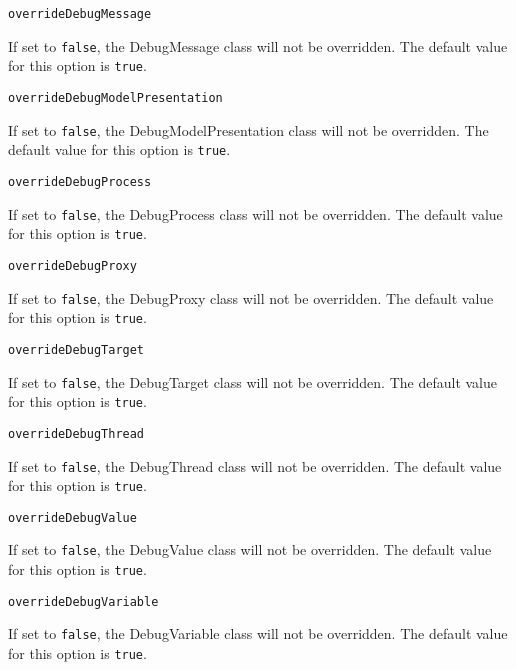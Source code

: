 \noindent\texttt{overrideDebugMessage}
\begin{myindentpar}{1cm}
If set to \texttt{false}, the DebugMessage class will not be overridden. The default value for this option is \texttt{true}.
\end{myindentpar}

\noindent\texttt{overrideDebugModelPresentation}
\begin{myindentpar}{1cm}
If set to \texttt{false}, the DebugModelPresentation class will not be overridden. The default value for this option is \texttt{true}.
\end{myindentpar}

\noindent\texttt{overrideDebugProcess}
\begin{myindentpar}{1cm}
If set to \texttt{false}, the DebugProcess class will not be overridden. The default value for this option is \texttt{true}.
\end{myindentpar}

\noindent\texttt{overrideDebugProxy}
\begin{myindentpar}{1cm}
If set to \texttt{false}, the DebugProxy class will not be overridden. The default value for this option is \texttt{true}.
\end{myindentpar}

\noindent\texttt{overrideDebugTarget}
\begin{myindentpar}{1cm}
If set to \texttt{false}, the DebugTarget class will not be overridden. The default value for this option is \texttt{true}.
\end{myindentpar}

\noindent\texttt{overrideDebugThread}
\begin{myindentpar}{1cm}
If set to \texttt{false}, the DebugThread class will not be overridden. The default value for this option is \texttt{true}.
\end{myindentpar}

\noindent\texttt{overrideDebugValue}
\begin{myindentpar}{1cm}
If set to \texttt{false}, the DebugValue class will not be overridden. The default value for this option is \texttt{true}.
\end{myindentpar}

\noindent\texttt{overrideDebugVariable}
\begin{myindentpar}{1cm}
If set to \texttt{false}, the DebugVariable class will not be overridden. The default value for this option is \texttt{true}.
\end{myindentpar}

